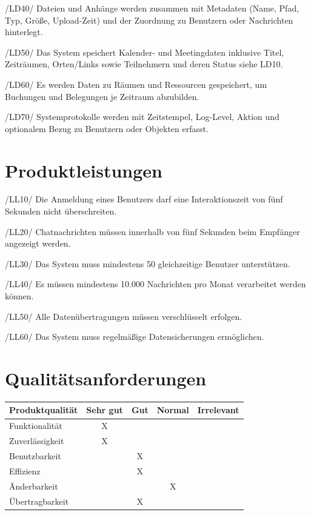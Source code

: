 \documentclass[12pt,a4paper]{extarticle}
\begin{document}
/LD40/ Dateien und Anhänge werden zusammen mit Metadaten (Name, Pfad, Typ, Größe, Upload-Zeit) und der Zuordnung zu Benutzern oder Nachrichten hinterlegt.

/LD50/ Das System speichert Kalender- und Meetingdaten inklusive Titel, Zeiträumen, Orten/Links sowie Teilnehmern und deren Status siehe LD10.

/LD60/ Es werden Daten zu Räumen und Ressourcen gespeichert, um Buchungen und Belegungen je Zeitraum abzubilden.

/LD70/ Systemprotokolle werden mit Zeitstempel, Log-Level, Aktion und optionalem Bezug zu Benutzern oder Objekten erfasst.  

\newpage
\section{Produktleistungen}

/LL10/ Die Anmeldung eines Benutzers darf eine Interaktionszeit von fünf Sekunden nicht überschreiten.  

/LL20/ Chatnachrichten müssen innerhalb von fünf Sekunden beim Empfänger angezeigt werden.  

/LL30/ Das System muss mindestens 50 gleichzeitige Benutzer unterstützen.  

/LL40/ Es müssen mindestens 10.000 Nachrichten pro Monat verarbeitet werden können.  

/LL50/ Alle Datenübertragungen müssen verschlüsselt erfolgen.  

/LL60/ Das System muss regelmäßige Datensicherungen ermöglichen.  
\vspace{0.5cm}
\section{Qualitätsanforderungen}

\begin{center}
  \begin{tabular}{|l|c|c|c|c|}
\hline
Produktqualität & Sehr gut & Gut & Normal & Irrelevant \\ \hline
Funktionalität & X & & & \\ \hline
Zuverlässigkeit & X & & & \\ \hline
Benutzbarkeit & & X & & \\ \hline
Effizienz & & X & & \\ \hline
Änderbarkeit & & & X & \\ \hline
Übertragbarkeit & & X & & \\ \hline
\end{tabular}  
\end{center}
\end{document}
